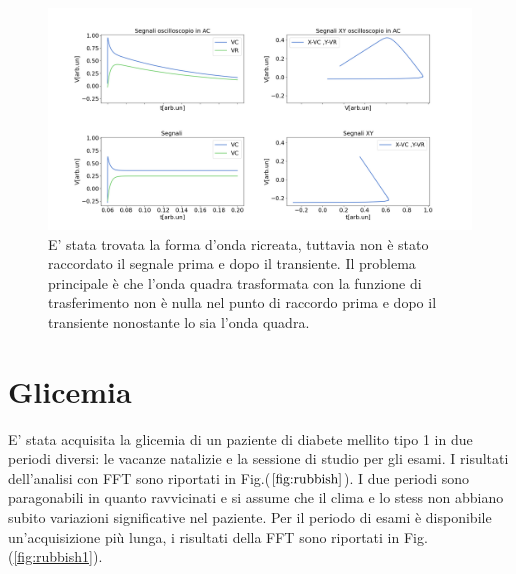 \documentclass{article}
\begin{document}
    \begin{figure}[H]
        \centering
        \includegraphics[width=\textwidth]{FFT13/pinnacolone.png}
        \caption{E' stata trovata la forma d'onda ricreata, tuttavia non è stato raccordato il segnale prima 
            e dopo il transiente. Il problema principale è che l'onda quadra trasformata con la funzione di 
            trasferimento non è nulla nel punto di raccordo prima e dopo il transiente
            nonostante lo sia l'onda quadra.}
        \label{fig:pinnacolone}
    \end{figure} 


\section{Glicemia}

        E' stata acquisita la glicemia di un paziente di diabete mellito tipo 1 in 
        due periodi diversi: le vacanze natalizie e la sessione di studio per gli esami.
        I risultati dell'analisi con FFT sono riportati in Fig.($\ref{fig:rubbish}$).
        I due periodi sono paragonabili in quanto ravvicinati e si assume che
        il clima e lo stess non abbiano subito variazioni significative 
        nel paziente.
        Per il periodo di esami  è disponibile un'acquisizione più lunga, i risultati
        della FFT sono  riportati in Fig.(\ref{fig:rubbish1}).
        
\end{document}
